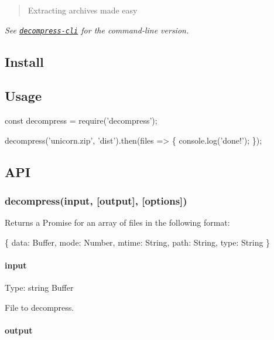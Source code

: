 \begin{quote}
Extracting archives made easy \end{quote}


{\itshape See \href{https://github.com/kevva/decompress-cli}{\tt decompress-\/cli} for the command-\/line version.}

\subsection*{Install}




\subsection*{Usage}


\begin{DoxyCode}
const decompress = require('decompress');

decompress('unicorn.zip', 'dist').then(files => \{
  console.log('done!');
\});
\end{DoxyCode}


\subsection*{A\+PI}

\subsubsection*{decompress(input, \mbox{[}output\mbox{]}, \mbox{[}options\mbox{]})}

Returns a Promise for an array of files in the following format\+:


\begin{DoxyCode}
\{
  data: Buffer,
  mode: Number,
  mtime: String,
  path: String,
  type: String
\}
\end{DoxyCode}


\paragraph*{input}

Type\+: {\ttfamily string} {\ttfamily Buffer}

File to decompress.

\paragraph*{output}

